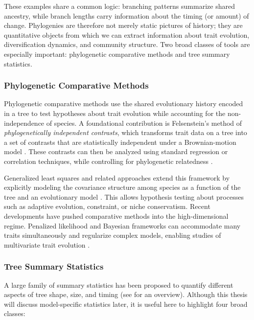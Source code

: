 These examples share a common logic: branching patterns summarize shared ancestry, while branch lengths carry information about the timing (or amount) of change. Phylogenies are therefore not merely static pictures of history; they are quantitative objects from which we can extract information about trait evolution, diversification dynamics, and community structure. Two broad classes of tools are especially important: phylogenetic comparative methods and tree summary statistics.

\subsubsection{Phylogenetic Comparative Methods}

Phylogenetic comparative methods use the shared evolutionary history encoded in a tree to test hypotheses about trait evolution while accounting for the non-independence of species. A foundational contribution is Felsenstein's method of \emph{phylogenetically independent contrasts}, which transforms trait data on a tree into a set of contrasts that are statistically independent under a Brownian-motion model \citep{felsenstein_phylogenies_1985}. These contrasts can then be analyzed using standard regression or correlation techniques, while controlling for phylogenetic relatedness \citep{stadler_decoding_2024}.

Generalized least squares and related approaches extend this framework by explicitly modeling the covariance structure among species as a function of the tree and an evolutionary model \citep{rzhetsky_statistical_1992,symonds_primer_2014}. This allows hypothesis testing about processes such as adaptive evolution, constraint, or niche conservatism. Recent developments have pushed comparative methods into the high-dimensional regime. Penalized likelihood and Bayesian frameworks can accommodate many traits simultaneously and regularize complex models, enabling studies of multivariate trait evolution \citep{clavel_penalized_2019,adams_multivariate_2018,fuentes-g_bayesian_2020}.

\subsubsection{Tree Summary Statistics}

A large family of summary statistics has been proposed to quantify different aspects of tree shape, size, and timing (see \citep{janzen_phylogenetic_2024} for an overview). Although this thesis will discuss model-specific statistics later, it is useful here to highlight four broad classes:

